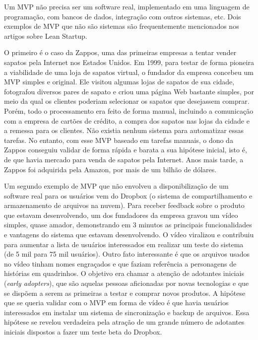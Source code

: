 \documentclass[
  11pt,
  twoside]{book}
\begin{document}
Um MVP não precisa ser um software real, implementado em uma linguagem
de programação, com bancos de dados, integração com outros sistemas,
etc. Dois exemplos de MVP que não são sistemas são frequentemente
mencionados nos artigos sobre Lean Startup.

  O primeiro é o
caso da Zappos, uma das primeiras empresas a tentar vender sapatos pela
Internet nos Estados Unidos. Em 1999, para testar de forma pioneira a
viabilidade de uma loja de sapatos virtual, o fundador da empresa
concebeu um MVP simples e original. Ele visitou algumas lojas de sapatos
de sua cidade, fotografou diversos pares de sapato e criou uma página
Web bastante simples, por meio da qual os clientes poderiam selecionar
os sapatos que desejassem comprar. Porém, todo o processamento era feito
de forma manual, incluindo a comunicação com a empresa de cartões de
crédito, a compra dos sapatos nas lojas da cidade e a remessa para os
clientes. Não existia nenhum sistema para automatizar essas tarefas. No
entanto, com esse MVP baseado em tarefas manuais, o dono da Zappos
conseguiu validar de forma rápida e barata a sua hipótese inicial, isto
é, de que havia mercado para venda de sapatos pela Internet. Anos mais
tarde, a Zappos foi adquirida pela Amazon, por mais de um bilhão de
dólares.

 

Um segundo exemplo de MVP que não envolveu a disponibilização de um
software real para os usuários vem do Dropbox (o sistema de
compartilhamento e armazenamento de arquivos na nuvem). Para receber
feedback sobre o produto que estavam desenvolvendo, um dos fundadores da
empresa gravou um vídeo simples, quase amador, demonstrando em 3 minutos
as principais funcionalidades e vantagens do sistema que estavam
desenvolvendo. O vídeo viralizou e contribuiu para aumentar a lista de
usuários interessados em realizar um teste do sistema (de 5 mil para 75
mil usuários). Outro fato interessante é que os arquivos usados no vídeo
tinham nomes engraçados e que faziam referência a personagens de
histórias em quadrinhos. O objetivo era chamar a atenção de adotantes
iniciais (\emph{early adopters}), que são aquelas pessoas aficionadas
por novas tecnologias e que se dispõem a serem as primeiras a testar e
comprar novos produtos. A hipótese que se queria validar com o MVP em
forma de vídeo é que havia usuários interessados em instalar um sistema
de sincronização e backup de arquivos. Essa hipótese se revelou
verdadeira pela atração de um grande número de adotantes iniciais
dispostos a fazer um teste beta do Dropbox.
\end{document}
